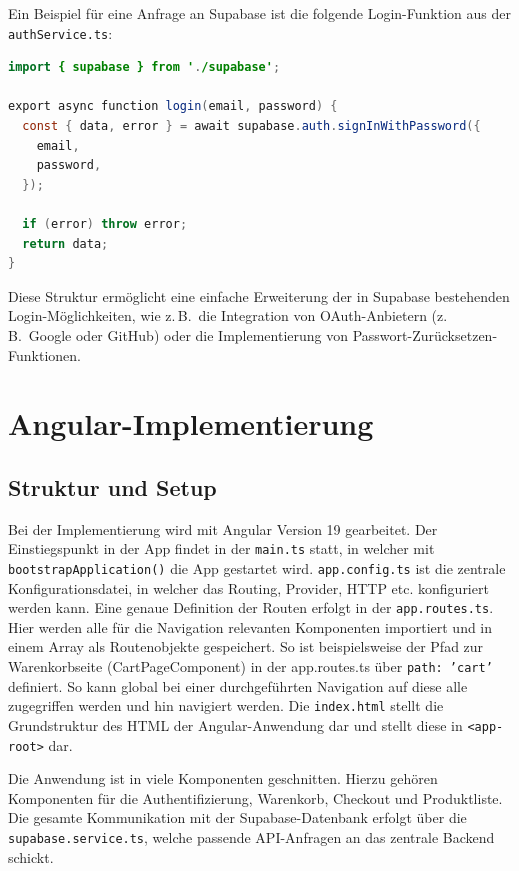 \documentclass[oneside]{ausarbeitung}
\begin{document}
Ein Beispiel für eine Anfrage an Supabase ist die folgende Login-Funktion aus der \texttt{authService.ts}:

\begin{lstlisting}[language=Java, caption={Login-Funktion im \texttt{authService.ts}}]
import { supabase } from './supabase';

export async function login(email, password) {
  const { data, error } = await supabase.auth.signInWithPassword({
    email,
    password,
  });

  if (error) throw error;
  return data;
}
\end{lstlisting}

Diese Struktur ermöglicht eine einfache Erweiterung der in Supabase bestehenden Login-Möglichkeiten, wie z.\,B.\ die Integration von OAuth-Anbietern (z.\,B.\ Google oder GitHub) oder die Implementierung von Passwort-Zurücksetzen-Funktionen.

\section{Angular-Implementierung}
\subsection{Struktur und Setup}

Bei der Implementierung wird mit Angular Version 19 gearbeitet. Der Einstiegspunkt in der App findet in der \texttt{main.ts} statt, in welcher mit \texttt{bootstrapApplication()} die App gestartet wird. \texttt{app.config.ts} ist die zentrale Konfigurationsdatei, in welcher das Routing, Provider, HTTP etc. konfiguriert werden kann. Eine genaue Definition der Routen erfolgt in der \texttt{app.routes.ts}. Hier werden alle für die Navigation relevanten Komponenten importiert und in einem Array als Routenobjekte gespeichert. So ist beispielsweise der Pfad zur Warenkorbseite (CartPageComponent) in der app.routes.ts über \texttt{path: 'cart'} definiert. So kann global bei einer durchgeführten Navigation auf diese alle zugegriffen werden und hin navigiert werden. Die \texttt{index.html} stellt die Grundstruktur des HTML der Angular-Anwendung dar und stellt diese in \texttt{<app-root>} dar.

Die Anwendung ist in viele Komponenten geschnitten. Hierzu gehören Komponenten für die Authentifizierung, Warenkorb, Checkout und Produktliste. Die gesamte Kommunikation mit der Supabase-Datenbank erfolgt über die \texttt{supabase.service.ts}, welche passende API-Anfragen an das zentrale Backend schickt.
\end{document}
